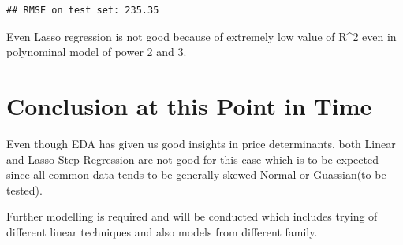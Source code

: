 \documentclass[
]{article}
\newenvironment{Shaded}{\begin{snugshade}}{\end{snugshade}}
\newcommand{\AttributeTok}[1]{\textcolor[rgb]{0.77,0.63,0.00}{#1}}
\newcommand{\CommentTok}[1]{\textcolor[rgb]{0.56,0.35,0.01}{\textit{#1}}}
\newcommand{\DecValTok}[1]{\textcolor[rgb]{0.00,0.00,0.81}{#1}}
\newcommand{\FunctionTok}[1]{\textcolor[rgb]{0.00,0.00,0.00}{#1}}
\newcommand{\NormalTok}[1]{#1}
\newcommand{\OtherTok}[1]{\textcolor[rgb]{0.56,0.35,0.01}{#1}}
\newcommand{\SpecialCharTok}[1]{\textcolor[rgb]{0.00,0.00,0.00}{#1}}
\newcommand{\StringTok}[1]{\textcolor[rgb]{0.31,0.60,0.02}{#1}}
\begin{document}
\begin{Shaded}
\end{Shaded}

\begin{verbatim}
## RMSE on test set: 235.35
\end{verbatim}

Even Lasso regression is not good because of extremely low value of
R\^{}2 even in polynominal model of power 2 and 3.

\hypertarget{conclusion-at-this-point-in-time}{%
\section{Conclusion at this Point in
Time}\label{conclusion-at-this-point-in-time}}

Even though EDA has given us good insights in price determinants, both
Linear and Lasso Step Regression are not good for this case which is to
be expected since all common data tends to be generally skewed Normal or
Guassian(to be tested).

Further modelling is required and will be conducted which includes
trying of different linear techniques and also models from different
family.
\end{document}

